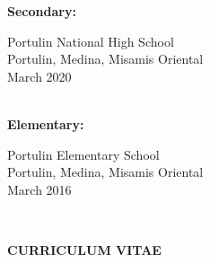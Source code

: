 {\begin{tabbing}
{\bf Secondary:} \> \parbox[t]{3.5in}{Portulin National High School \\
                   Portulin, Medina, Misamis Oriental \\
                   March 2020} \\[18pt]


{\bf Elementary:} \> \parbox[t]{3.5in}{Portulin Elementary School \\
                    Portulin, Medina, Misamis Oriental \\
                    March 2016} \\
\end{tabbing}
}


\newpage




\thispagestyle{empty}


\begin{center}
    {\bf CURRICULUM VITAE}\\[24pt]
\end{center}


